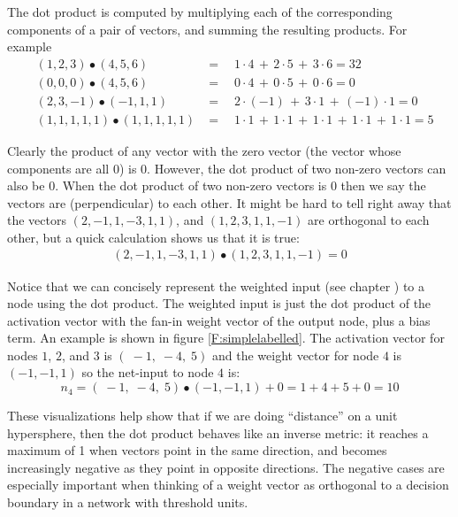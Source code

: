    The dot product is computed by multiplying each of the corresponding 
components of a pair of vectors, and summing the resulting products.  For 
example
\begin{eqnarray*}
&(1,2,3)  \bullet  (4,5,6)& = \quad 1 \cdot 4 \,+\, 2 \cdot 5 \,+\, 3 \cdot 6 
= 32 \\
&(0,0,0)  \bullet  (4,5,6)& = \quad 0 \cdot 4 \,+\, 0 \cdot 5 \,+\, 0 \cdot 6 
= 0  \\
&(2,3,-1) \bullet (-1,1,1)& = \quad 2 \cdot (-1) \,+\, 3 \cdot 1 \,+\, (-1) 
\cdot 1 = 0 \\
&(1,1,1,1,1) \bullet (1,1,1,1,1)& = \quad  
 1 \cdot 1 \,+\, 1 \cdot 1 \,+\,  1 \cdot 1 \,+\, 1 \cdot 1 \,+\, 1 \cdot 1 = 5
\end{eqnarray*}

   Clearly the product of any vector with the zero vector (the vector whose
components are all $0$) is $0$.  However, the dot product of two non-zero 
vectors can also be $0$.  When the dot product of two non-zero vectors is $0$ 
then we say the vectors are  (perpendicular) to each 
other.  It might be hard to tell right away that the vectors $(2,-1,1,-3,1,1)$,
and $(1,2,3,1,1,-1)$ are orthogonal to each other, but a quick calculation 
shows us that it is true:
\begin{eqnarray*}
           (2,-1,1,-3,1,1) \bullet (1,2,3,1,1,-1) = 0
\end{eqnarray*}

   Notice that we can concisely represent the weighted input (see chapter 
) to a node using the dot product.  The weighted input 
is just the dot product of the activation vector with the fan-in weight vector 
of the output node, plus a bias term.  An example is shown in figure 
\ref{F:simplelabelled}.  The activation vector for nodes $1$, $2$, and $3$ is 
$(\; -1,\; -4,\; 5)$ and the weight vector for node $4$ is $(-1,-1,1)$ so the 
net-input to node $4$ is:
\begin{equation*}
n_4 = (\; -1,\; -4,\; 5) \bullet (-1,-1,1) + 0  = 1 + 4 + 5 + 0 = 10
\end{equation*}

   These visualizations help show that if we are doing ``distance'' on a unit hypersphere, then the dot product behaves like an inverse metric: it reaches a maximum of 1 when vectors point in the same direction, and becomes increasingly negative as they point in opposite directions. The negative cases are especially important when thinking of a weight vector as orthogonal to a decision boundary in a network with threshold units.
 
